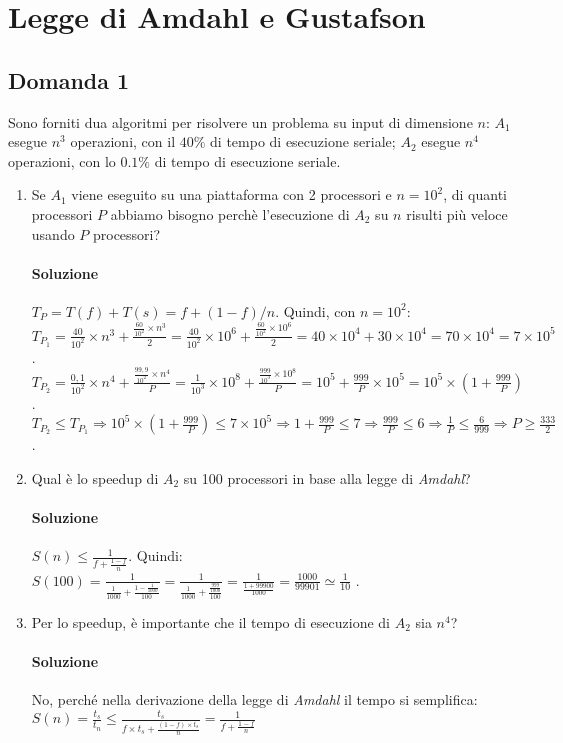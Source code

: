 \section{Legge di Amdahl e Gustafson}

\subsection{Domanda 1}
Sono forniti dua algoritmi per risolvere un problema su input di dimensione $n$: $A_1$ esegue $n^3$ operazioni, con il $40\%$ di tempo di esecuzione seriale; $A_2$ esegue $n^4$ operazioni, con lo $0.1\%$ di tempo di esecuzione seriale.
\begin{enumerate}
	\item Se $A_1$ viene eseguito su una piattaforma con 2 processori e $n = 10^2$, di quanti processori $P$ abbiamo bisogno perch\`{e} l'esecuzione di $A_2$ su $n$ risulti più veloce usando $P$ processori?
	\paragraph{Soluzione}
	$T_P = T(f) + T(s) = f + (1-f)/n$. 	Quindi, con $n = 10^2$: \\
	$T_{P_1} = \frac{40}{10^2}\times n^3 + \frac{\frac{60}{10^2}\times n^3}{2} = \frac{40}{10^2}\times 10^6 + \frac{\frac{60}{10^2}\times 10^6}{2} = 40\times 10^4 + 30\times 10^4 = 70\times 10^4 = 7\times 10^5$ .\\
	$T_{P_2} = \frac{0,1}{10^2}\times n^4 + \frac{\frac{99,9}{10^2}\times n^4}{P} = \frac{1}{10^3}\times 10^8 +  \frac{\frac{999}{10^3}\times 10^8}{P} = 10^5 + \frac{999}{P}\times 10^5 = 10^5\times(1 + \frac{999}{P})$ . \\
	$T_{P_2} \leq T_{P_1} \Rightarrow 10^5\times(1 + \frac{999}{P}) \leq 7\times 10^5 \Rightarrow 1 + \frac{999}{P} \leq 7 \Rightarrow \frac{999}{P} \leq 6 \Rightarrow \frac{1}{P} \leq \frac{6}{999} \Rightarrow P \geq \frac{333}{2}$ .
	\item Qual è lo speedup di $A_2$ su 100 processori in base alla legge di \textit{Amdahl}?
	\paragraph{Soluzione}
	$S(n) \leq \frac{1}{f + \frac{1-f}{n}}$. Quindi: \\
	$S(100) = \frac{1}{\frac{1}{1000}+ \frac{1 - \frac{1}{1000}}{100}} = \frac{1}{\frac{1}{1000} + \frac{\frac{999}{1000}}{100}} = \frac{1}{\frac{1+99900}{1000}} = \frac{1000}{99901} \simeq \frac{1}{10}$ .
	\item Per lo speedup, è importante che il tempo di esecuzione di $A_2$ sia $n^4$?
	\paragraph{Soluzione}
	No, perché nella derivazione della legge di \textit{Amdahl} il tempo si semplifica: $S(n) = \frac{t_s}{t_n} \leq \frac{t_s}{f\times t_s + \frac{(1-f)\times t_s}{n}} = \frac{1}{f + \frac{1-f}{n}}$
\end{enumerate}

